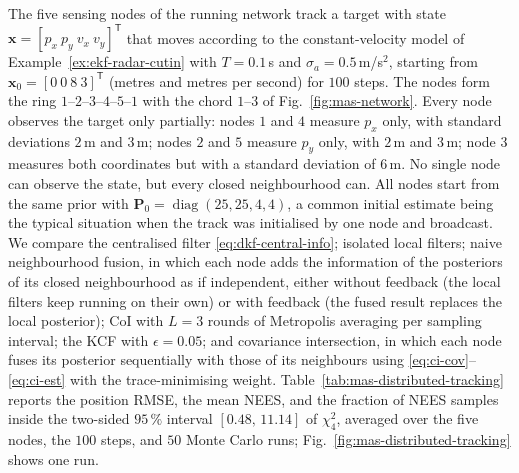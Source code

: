 \documentclass[graybox,envcountchap]{style/SNmono}
\DeclareMathOperator{\diag}{diag}
\begin{document}
\begin{example}
\label{ex:mas-distributed-tracking}
The five sensing nodes of the running network track a target with state $\mathbf{x}=[p_x\ p_y\ v_x\ v_y]^{\mathsf T}$ that moves according to the constant-velocity model of Example~\ref{ex:ekf-radar-cutin} with $T=0.1$\,s and $\sigma_a=0.5$\,m/s$^2$, starting from $\mathbf{x}_0=[0\ 0\ 8\ 3]^{\mathsf T}$ (metres and metres per second) for $100$ steps. The nodes form the ring $1$--$2$--$3$--$4$--$5$--$1$ with the chord $1$--$3$ of Fig.~\ref{fig:mas-network}. Every node observes the target only partially: nodes $1$ and $4$ measure $p_x$ only, with standard deviations $2$\,m and $3$\,m; nodes $2$ and $5$ measure $p_y$ only, with $2$\,m and $3$\,m; node $3$ measures both coordinates but with a standard deviation of $6$\,m. No single node can observe the state, but every closed neighbourhood can. All nodes start from the same prior with $\mathbf{P}_0=\diag(25,25,4,4)$, a common initial estimate being the typical situation when the track was initialised by one node and broadcast. We compare the centralised filter \eqref{eq:dkf-central-info}; isolated local filters; naive neighbourhood fusion, in which each node adds the information of the posteriors of its closed neighbourhood as if independent, either without feedback (the local filters keep running on their own) or with feedback (the fused result replaces the local posterior); CoI with $L=3$ rounds of Metropolis averaging per sampling interval; the KCF with $\epsilon=0.05$; and covariance intersection, in which each node fuses its posterior sequentially with those of its neighbours using \eqref{eq:ci-cov}--\eqref{eq:ci-est} with the trace-minimising weight. Table~\ref{tab:mas-distributed-tracking} reports the position RMSE, the mean NEES, and the fraction of NEES samples inside the two-sided $95\,\%$ interval $[0.48,\,11.14]$ of $\chi^{2}_{4}$, averaged over the five nodes, the $100$ steps, and $50$ Monte Carlo runs; Fig.~\ref{fig:mas-distributed-tracking} shows one run.


\end{example}
\end{document}
